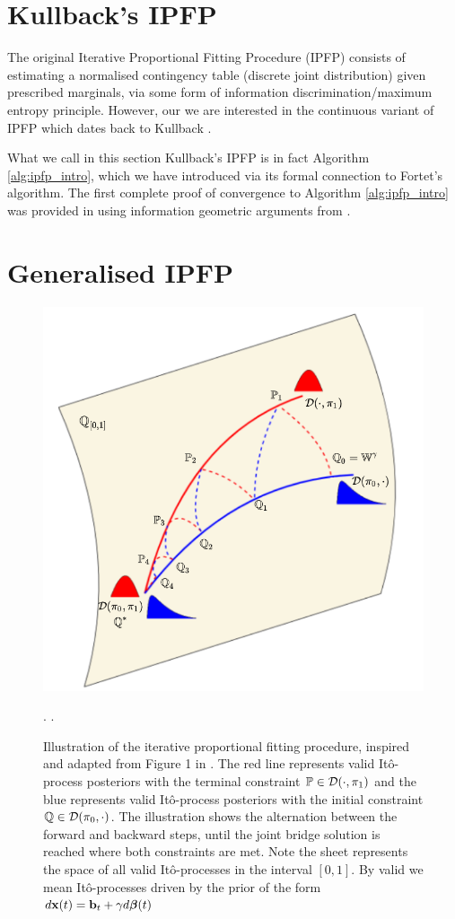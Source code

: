 \documentclass[a4paper,12pt,twoside,openright]{report}
\theoremstyle{definition}
\begin{document}
\section{Kullback's IPFP}
The original Iterative Proportional Fitting Procedure (IPFP) consists of estimating a normalised contingency table (discrete joint distribution) given prescribed marginals, via some form of information discrimination/maximum entropy principle. However, our we are interested in the continuous variant of IPFP which dates back to Kullback \citep{kullback1968probability}.

What we call in this section Kullback's IPFP is in fact Algorithm \ref{alg:ipfp_intro}, which we have introduced via its formal connection to Fortet's algorithm.  The first complete proof of convergence to Algorithm \ref{alg:ipfp_intro} was provided in \cite{ruschendorf1995convergence} using information geometric arguments from \cite{csiszar1975divergence}.

\section{Generalised IPFP}

\begin{figure}[t!]
    \centering
    \includegraphics[]{images/g-IPFP_ready.PNG}
    \caption{Illustration of the iterative proportional fitting procedure, inspired and adapted from Figure 1 in \cite{bernton2019schr}. The red line represents valid Itô-process posteriors with the terminal constraint ${\mathbb{P}} \in {\mathcal{D}}(\cdot, \pi_1)$ and the blue represents valid Itô-process posteriors with the initial constraint ${\mathbb{Q}} \in {\mathcal{D}}( \pi_0, \cdot)$. The illustration shows the alternation between the forward and backward steps, until the joint bridge solution is reached where both constraints are met. Note the sheet represents the space of all valid Itô-processes in the interval $[0,1]$. By valid we mean Itô-processes driven by the prior of the form $d{\mathbf{x}}(t) = {\mathbf{b}}_t + \gamma d{\bm{\beta}}(t)$}.
    \label{fig:info_pro}.
\end{figure}
\end{document}
